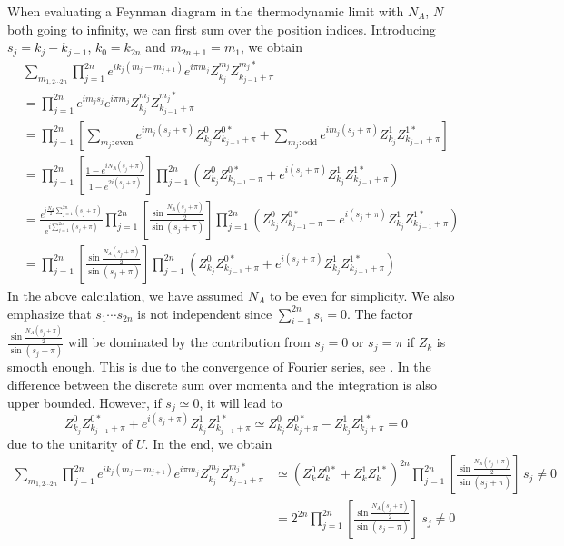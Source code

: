 When evaluating a Feynman diagram in the thermodynamic limit with %
$N_{A}$, $N$ both going to infinity,
we can first sum over the position indices. Introducing $s_{j}=k_{j}-k_{j-1}$, $k_{0}=k_{2n}$
and $m_{2n+1}=m_{1}$, we obtain
\begin{align*}
 & \sum_{m_{1,2\cdots2n}}\prod_{j=1}^{2n}e^{ik_{j}(m_{j}-m_{j+1})}e^{i\pi m_{j}}Z_{k_{j}}^{m_{j}}Z_{k_{j-1}+\pi}^{m_{j}*}\\
 & =\prod_{j=1}^{2n}e^{im_{j}s_{j}}e^{i\pi m_{j}}Z_{k_{j}}^{m_{j}}Z_{k_{j-1}+\pi}^{m_{j}*}\\
 & =\prod_{j=1}^{2n}\left[\sum_{m_{j}:\mathrm{even}}e^{im_{j}(s_{j}+\pi)}Z_{k_{j}}^{0}Z_{k_{j-1}+\pi}^{0*}+\sum_{m_{j}:\mathrm{odd}}e^{im_{j}(s_{j}+\pi)}Z_{k_{j}}^{1}Z_{k_{j-1}+\pi}^{1*}\right]\\
 & =\prod_{j=1}^{2n}\left[\frac{1-e^{iN_{A}(s_{j}+\pi)}}{1-e^{2i(s_{j}+\pi)}}\right]\prod_{j=1}^{2n}(Z_{k_{j}}^{0}Z_{k_{j-1}+\pi}^{0*}+e^{i(s_{j}+\pi)}Z_{k_{j}}^{1}Z_{k_{j-1}+\pi}^{1*})\\
 & =\frac{e^{i\frac{N_{A}}{2}\sum_{j=1}^{2n}(s_{j}+\pi)}}{e^{i\sum_{j=1}^{2n}(s_{j}+\pi)}}\prod_{j=1}^{2n}\left[\frac{\sin\frac{N_{A}(s_{j}+\pi)}{2}}{\sin(s_{j}+\pi)}\right]\prod_{j=1}^{2n}(Z_{k_{j}}^{0}Z_{k_{j-1}+\pi}^{0*}+e^{i(s_{j}+\pi)}Z_{k_{j}}^{1}Z_{k_{j-1}+\pi}^{1*})\\
 & =\prod_{j=1}^{2n}\left[\frac{\sin\frac{N_{A}(s_{j}+\pi)}{2}}{\sin(s_{j}+\pi)}\right]\prod_{j=1}^{2n}(Z_{k_{j}}^{0}Z_{k_{j-1}+\pi}^{0*}+e^{i(s_{j}+\pi)}Z_{k_{j}}^{1}Z_{k_{j-1}+\pi}^{1*})
\end{align*}
In the above calculation, we have assumed $N_{A}$ to be even for simplicity. We also emphasize that $s_{1}\cdots s_{2n}$ is not independent since $\sum_{i=1}^{2n}s_{i}=0$.
The factor $\frac{\sin\frac{N_{A}(s_{j}+\pi)}{2}}{\sin(s_{j}+\pi)}$
will be dominated by the contribution from $s_{j}=0$ or $s_{j}=\pi$
if $Z_{k}$ is smooth enough. This is due to the convergence of Fourier
series, see \citep{stein2003fourier}. In \citep{Kress1998}
the difference between the discrete sum over momenta and the integration is also upper bounded. However, if $s_{j}\simeq%
0$, it will lead to 
\begin{equation}
Z_{k_{j}}^{0}Z_{k_{j-1}+\pi}^{0*}+e^{i(s_{j}+\pi)}Z_{k_{j}}^{1}Z_{k_{j-1}+\pi}^{1*}\simeq%
Z_{k_{j}}^{0}Z_{k_{j}+\pi}^{0*}-Z_{k_{j}}^{1}Z_{k_{j}+\pi}^{1*}=0
\end{equation}
due to the unitarity of $U$. In the end, %
we obtain 
\begin{align}
\sum_{m_{1,2\cdots2n}}\prod_{j=1}^{2n}e^{ik_{j}(m_{j}-m_{j+1})}e^{i\pi m_{j}}Z_{k_{j}}^{m_{j}}Z_{k_{j-1}+\pi}^{m_{j}*} & \simeq(Z_{k}^{0}Z_{k}^{0*}+Z_{k}^{1}Z_{k}^{1*})^{2n}\prod_{j=1}^{2n}\left[\frac{\sin\frac{N_{A}(s_{j}+\pi)}{2}}{\sin(s_{j}+\pi)}\right]\,s_{j}\neq 0\nonumber \\
 & =2^{2n}\prod_{j=1}^{2n}\left[\frac{\sin\frac{N_{A}(s_{j}+\pi)}{2}}{\sin(s_{j}+\pi)}\right]\ s_{j}\neq 0
 \label{eq:Summing_Over_position}
\end{align}
